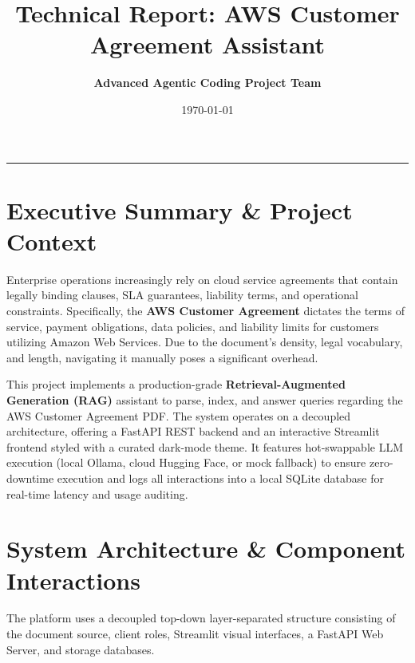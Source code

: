 \documentclass[11pt,a4paper]{article}
\title{\textbf{Technical Report: AWS Customer Agreement Assistant}}
\author{\textbf{Advanced Agentic Coding Project Team}}
\date{\today}
\begin{document}
\maketitle

\hrule
\vspace{1.5em}

\section{Executive Summary \& Project Context}
Enterprise operations increasingly rely on cloud service agreements that contain legally binding clauses, SLA guarantees, liability terms, and operational constraints. Specifically, the \textbf{AWS Customer Agreement} dictates the terms of service, payment obligations, data policies, and liability limits for customers utilizing Amazon Web Services. Due to the document's density, legal vocabulary, and length, navigating it manually poses a significant overhead.

This project implements a production-grade \textbf{Retrieval-Augmented Generation (RAG)} assistant to parse, index, and answer queries regarding the AWS Customer Agreement PDF. The system operates on a decoupled architecture, offering a FastAPI REST backend and an interactive Streamlit frontend styled with a curated dark-mode theme. It features hot-swappable LLM execution (local Ollama, cloud Hugging Face, or mock fallback) to ensure zero-downtime execution and logs all interactions into a local SQLite database for real-time latency and usage auditing.

\section{System Architecture \& Component Interactions}
The platform uses a decoupled top-down layer-separated structure consisting of the document source, client roles, Streamlit visual interfaces, a FastAPI Web Server, and storage databases.
\end{document}
